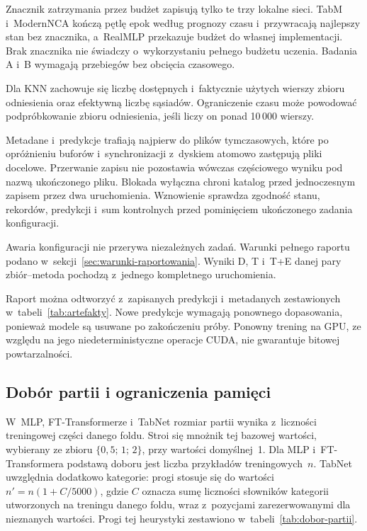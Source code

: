 Znacznik zatrzymania przez budżet zapisują tylko te trzy lokalne sieci. TabM i~ModernNCA kończą pętlę epok według prognozy czasu i~przywracają najlepszy stan bez znacznika, a~RealMLP przekazuje budżet do własnej implementacji. Brak znacznika nie świadczy o~wykorzystaniu pełnego budżetu uczenia. Badania A i~B wymagają przebiegów bez obcięcia czasowego.

Dla KNN zachowuje się liczbę dostępnych i~faktycznie użytych wierszy zbioru odniesienia oraz efektywną liczbę sąsiadów. Ograniczenie czasu może powodować podpróbkowanie zbioru odniesienia, jeśli liczy on ponad 10\,000 wierszy.

Metadane i~predykcje trafiają najpierw do plików tymczasowych, które po opróżnieniu buforów i~synchronizacji z~dyskiem atomowo zastępują pliki docelowe. Przerwanie zapisu nie pozostawia wówczas częściowego wyniku pod nazwą ukończonego pliku. Blokada wyłączna chroni katalog przed jednoczesnym zapisem przez dwa uruchomienia. Wznowienie sprawdza zgodność stanu, rekordów, predykcji i~sum kontrolnych przed pominięciem ukończonego zadania konfiguracji.

Awaria konfiguracji nie przerywa niezależnych zadań. Warunki pełnego raportu podano w~sekcji~\ref{sec:warunki-raportowania}. Wyniki D, T i~T+E danej pary zbiór--metoda pochodzą z~jednego kompletnego uruchomienia.

Raport można odtworzyć z~zapisanych predykcji i~metadanych zestawionych w~tabeli~\ref{tab:artefakty}. Nowe predykcje wymagają ponownego dopasowania, ponieważ modele są usuwane po zakończeniu próby. Ponowny trening na GPU, ze względu na jego niedeterministyczne operacje CUDA, nie gwarantuje bitowej powtarzalności.

\subsection{Dobór partii i ograniczenia pamięci}
\label{sec:partie-platformy}

W~MLP, FT-Transformerze i~TabNet rozmiar partii wynika z~liczności treningowej części danego foldu. Stroi się mnożnik tej bazowej wartości, wybierany ze zbioru $\{0{,}5;\,1;\,2\}$, przy wartości domyślnej~1. Dla MLP i~FT-Transformera podstawą doboru jest liczba przykładów treningowych~$n$. TabNet uwzględnia dodatkowo kategorie: progi stosuje się do wartości $n'=n(1+C/5000)$, gdzie $C$ oznacza sumę liczności słowników kategorii utworzonych na treningu danego foldu, wraz z~pozycjami zarezerwowanymi dla nieznanych wartości. Progi tej heurystyki zestawiono w~tabeli~\ref{tab:dobor-partii}.

